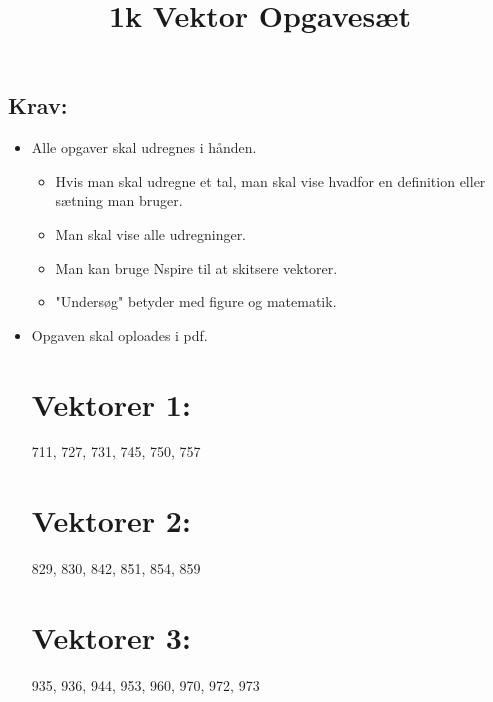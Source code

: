 \documentclass[10pt,a4paper]{article}
\begin{document}
	\title{1k Vektor Opgavesæt}
	\maketitle
\subsection*{Krav:}
\begin{itemize}
	\item Alle opgaver skal udregnes i hånden.
	\begin{itemize}
		\item Hvis man skal udregne et tal, man skal vise hvadfor en definition eller sætning man bruger.
		\item Man skal vise alle udregninger.
		\item Man kan bruge Nspire til at skitsere vektorer.
		\item "Undersøg" betyder med figure og matematik.
	\end{itemize}
	\item Opgaven skal oploades i pdf.

\section{Vektorer 1:}
711, 727, 731, 745, 750, 757

\section{Vektorer 2:}
829, 830, 842, 851, 854, 859

\section{Vektorer 3:}
935, 936, 944, 953, 960, 970, 972, 973	
\end{itemize}

	
\end{document}
